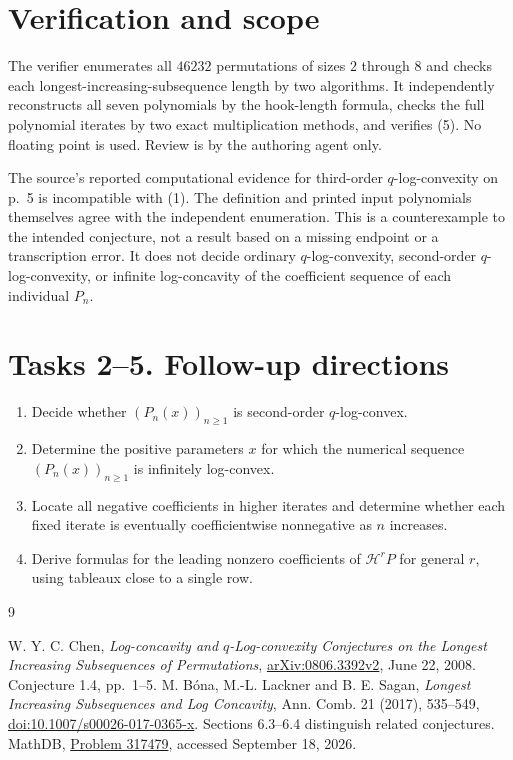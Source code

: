 \documentclass[11pt]{article}
\newcommand{\HH}{\mathcal H}
\begin{document}
\section*{Verification and scope}
The verifier enumerates all $46232$ permutations of sizes $2$ through
$8$ and checks each longest-increasing-subsequence length by two
algorithms. It independently reconstructs all seven polynomials by
the hook-length formula, checks the full polynomial iterates by two
exact multiplication methods, and verifies (5). No floating point
is used. Review is by the authoring agent only.

The source's reported computational evidence for third-order
$q$-log-convexity on p.~5 is incompatible with (1).
The definition and printed input polynomials themselves agree with
the independent enumeration. This is a counterexample to the intended
conjecture, not a result based on a missing endpoint or a transcription
error. It does not decide ordinary $q$-log-convexity, second-order
$q$-log-convexity, or infinite log-concavity of the coefficient
sequence of each individual $P_n$.

\section*{Tasks 2--5. Follow-up directions}
\begin{enumerate}[start=2,leftmargin=*]
\item Decide whether $(P_n(x))_{n\ge1}$ is second-order
$q$-log-convex.
\item Determine the positive parameters $x$ for which the numerical
sequence $(P_n(x))_{n\ge1}$ is infinitely log-convex.
\item Locate all negative coefficients in higher iterates and
determine whether each fixed iterate is eventually coefficientwise
nonnegative as $n$ increases.
\item Derive formulas for the leading nonzero coefficients of
$\HH^rP$ for general $r$, using tableaux close to a single row.
\end{enumerate}

\begin{thebibliography}{9}
\raggedright
{} W. Y. C. Chen,
\emph{Log-concavity and $q$-Log-convexity Conjectures on the
Longest Increasing Subsequences of Permutations},
\href{https://arxiv.org/abs/0806.3392v2}{arXiv:0806.3392v2},
June 22, 2008. Conjecture 1.4, pp.~1--5.
 M. B\'ona, M.-L. Lackner and B. E. Sagan,
\emph{Longest Increasing Subsequences and Log Concavity},
Ann. Comb. 21 (2017), 535--549,
\href{https://doi.org/10.1007/s00026-017-0365-x}{doi:10.1007/s00026-017-0365-x}.
Sections 6.3--6.4 distinguish related conjectures.
 MathDB, \href{https://mathdb.com/p/317479}{Problem 317479},
accessed September 18, 2026.
\end{thebibliography}
\end{document}
